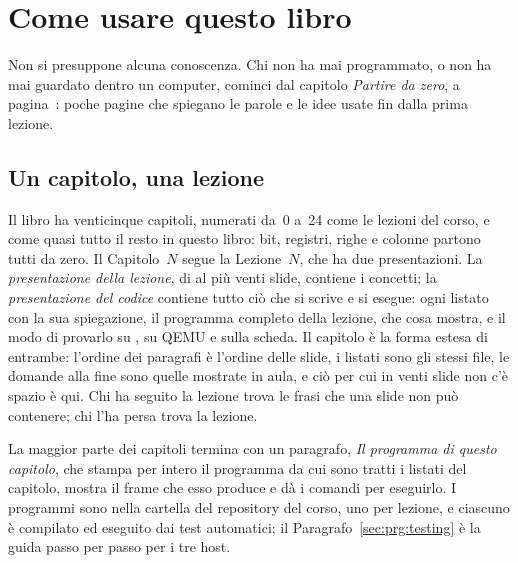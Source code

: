 \chapter{Come usare questo libro}

Non si presuppone alcuna conoscenza. Chi non ha mai programmato, o non ha mai
guardato dentro un computer, cominci dal capitolo \emph{Partire da zero}, a
pagina~\pageref{ch:zero}: poche pagine che spiegano le parole e le idee usate
fin dalla prima lezione.

\section*{Un capitolo, una lezione}

Il libro ha venticinque capitoli, numerati da~0 a~24 come le lezioni del corso,
e come quasi tutto il resto in questo libro: bit, registri, righe e colonne
partono tutti da zero. Il Capitolo~$N$ segue la Lezione~$N$, che ha due
presentazioni. La \emph{presentazione della lezione}, di al più venti slide,
contiene i concetti; la \emph{presentazione del codice} contiene tutto ciò che
si scrive e si esegue: ogni listato con la sua spiegazione, il programma
completo della lezione, che cosa mostra, e il modo di provarlo su \prgqt, su
QEMU e sulla scheda. Il capitolo è la forma estesa di entrambe: l'ordine dei
paragrafi è l'ordine delle slide, i listati sono gli stessi file, le domande
alla fine sono quelle mostrate in aula, e ciò per cui in venti slide non c'è
spazio è qui. Chi ha seguito la lezione trova le frasi che una slide non può
contenere; chi l'ha persa trova la lezione.

La maggior parte dei capitoli termina con un paragrafo, \emph{Il programma di
questo capitolo}, che stampa per intero il programma da cui sono tratti i
listati del capitolo, mostra il frame che esso produce e dà i comandi per
eseguirlo. I programmi sono nella cartella  del repository del
corso, uno per lezione, e ciascuno è compilato ed eseguito dai test automatici;
il Paragrafo~\ref{sec:prg:testing} è la guida passo per passo per i tre host.

